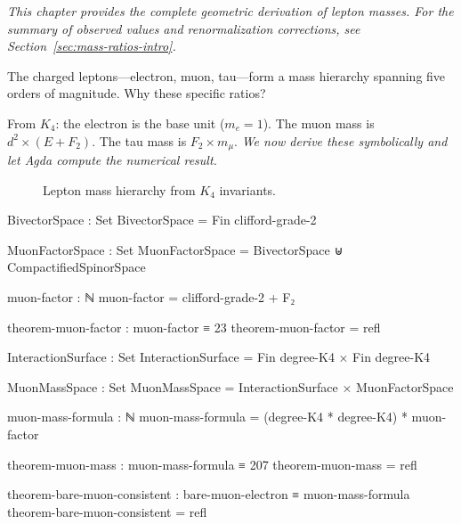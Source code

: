 \documentclass[11pt,a4paper]{book}
\begin{document}
\noindent\textit{This chapter provides the complete geometric derivation of lepton masses. For the summary of observed values and renormalization corrections, see Section~\ref{sec:mass-ratios-intro}.}

\medskip
The charged leptons---electron, muon, tau---form a mass hierarchy spanning five orders of magnitude. Why these specific ratios?

From $K_4$: the electron is the base unit ($m_e = 1$). The muon mass is $d^2 \times (E + F_2)$. The tau mass is $F_2 \times m_\mu$. \emph{We now derive these symbolically and let Agda compute the numerical result.}

\begin{figure}[h]
\centering
{}
\caption{Lepton mass hierarchy from $K_4$ invariants.}
\label{fig:lepton-masses}
\end{figure}

\begin{code}
BivectorSpace : Set
BivectorSpace = Fin clifford-grade-2

MuonFactorSpace : Set
MuonFactorSpace = BivectorSpace ⊎ CompactifiedSpinorSpace

muon-factor : ℕ
muon-factor = clifford-grade-2 + F₂

theorem-muon-factor : muon-factor ≡ 23
theorem-muon-factor = refl
\end{code}

\begin{code}
InteractionSurface : Set
InteractionSurface = Fin degree-K4 × Fin degree-K4

MuonMassSpace : Set
MuonMassSpace = InteractionSurface × MuonFactorSpace

muon-mass-formula : ℕ
muon-mass-formula = (degree-K4 * degree-K4) * muon-factor

theorem-muon-mass : muon-mass-formula ≡ 207
theorem-muon-mass = refl

theorem-bare-muon-consistent : bare-muon-electron ≡ muon-mass-formula
theorem-bare-muon-consistent = refl
\end{code}
\end{document}
